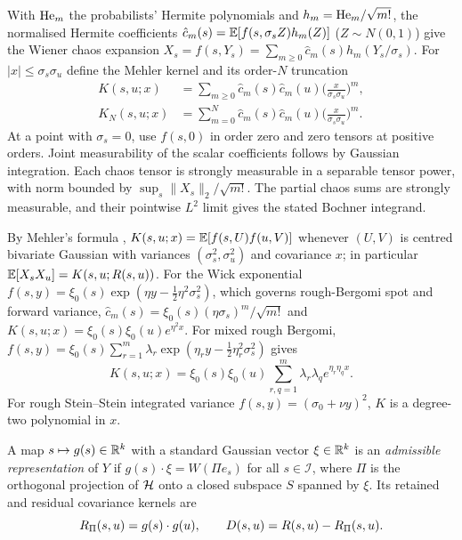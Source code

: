 With $\mathrm{He}_m$ the probabilists' Hermite polynomials and $h_m=\mathrm{He}_m/\sqrt{m!}$, the normalised Hermite
coefficients $\hat c_m(s)=\mathbb{E}[f(s,\sigma_sZ)h_m(Z)]$ ($Z\sim N(0,1)$) give the Wiener chaos expansion
$X_s=f(s,Y_s)=\sum_{m\ge0}\hat c_m(s)h_m(Y_s/\sigma_s)$. For $|x|\le\sigma_s\sigma_u$ define the Mehler
kernel and its order-$N$ truncation
\begin{equation}\label{eq:mehler_kernel}
\begin{split}
  K(s,u;x)&=\sum_{m\ge0}\hat c_m(s)\hat c_m(u)\Big(\frac{x}{\sigma_s\sigma_u}\Big)^m,\\
  K_N(s,u;x)&=\sum_{m=0}^N\hat c_m(s)\hat c_m(u)\Big(\frac{x}{\sigma_s\sigma_u}\Big)^m.
\end{split}
\end{equation}
At a point with $\sigma_s=0$, use $f(s,0)$ in order zero and zero tensors at positive orders.
Joint measurability of the scalar coefficients follows by Gaussian integration.
Each chaos tensor is strongly measurable in a separable tensor power, with norm bounded by
$\sup_s\|X_s\|_2/\sqrt{m!}$. The partial chaos sums are strongly measurable, and their pointwise
$L^2$ limit gives the stated Bochner integrand.

By Mehler's formula \citep{Mehler1866,Janson1997}, $K(s,u;x)=\mathbb{E}[f(s,U)f(u,V)]$ whenever $(U,V)$ is
centred bivariate Gaussian with variances $(\sigma_s^2,\sigma_u^2)$ and covariance $x$; in particular
$\mathbb{E}[X_sX_u]=K(s,u;R(s,u))$. For the Wick exponential $f(s,y)=\xi_0(s)\exp(\eta y-\tfrac12\eta^2\sigma_s^2)$,
which governs rough-Bergomi spot and forward variance, $\hat c_m(s)=\xi_0(s)(\eta\sigma_s)^m/\sqrt{m!}$ and
$K(s,u;x)=\xi_0(s)\xi_0(u)e^{\eta^2x}$. For mixed rough Bergomi, $f(s,y)=\xi_0(s)\sum_{r=1}^m\lambda_r\exp(\eta_r y-\tfrac12\eta_r^2\sigma_s^2)$
gives
\[
  K(s,u;x)=\xi_0(s)\xi_0(u)\sum_{r,q=1}^m\lambda_r\lambda_q e^{\eta_r\eta_q x}.
\]
For rough Stein--Stein integrated variance $f(s,y)=(\sigma_0+\nu y)^2$, $K$ is a degree-two polynomial in $x$.

\begin{definition}\label{def:rep}
A map $s\mapsto g(s)\in\mathbb{R}^k$ with a standard Gaussian vector $\xi\in\mathbb{R}^k$ is an \emph{admissible
representation} of $Y$ if $g(s)\cdot\xi=W(\Pi e_s)$ for all $s\in\mathcal{I}$, where $\Pi$ is the
orthogonal projection of $\mathcal{H}$ onto a closed subspace $S$ spanned by $\xi$. Its retained and residual
covariance kernels are
\[
  R_\Pi(s,u)=g(s)\cdot g(u),\qquad D(s,u)=R(s,u)-R_\Pi(s,u).
\]
\end{definition}

